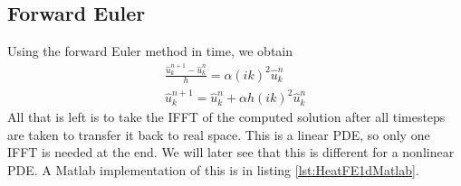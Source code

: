 \subsection{Forward Euler}
Using the forward Euler method in time, we obtain
\begin{eqnarray}
\frac{\hat{u}_k^{n+1}-\hat{u}_k^n}{h} = \alpha (ik)^2 \hat{u}_k^n \\
\hat{u}_k^{n+1} =\hat{u}_{k}^n+\alpha h(ik)^2\hat{u}_k^n  
\end{eqnarray}
All that is left is to take the IFFT of the computed solution after all timesteps are taken to transfer it back to real space. This is a linear PDE, so only one IFFT is needed at the end. We will later see that this is different for a nonlinear PDE. A Matlab implementation of this is in listing \ref{lst:HeatFE1dMatlab}.


 
